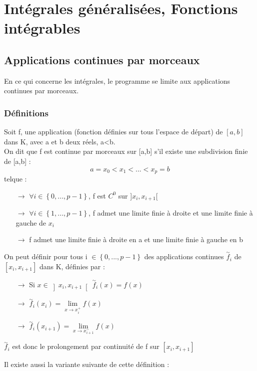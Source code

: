 \chapter{Intégrales généralisées, Fonctions intégrables}
\section{Applications continues par morceaux}
En ce qui concerne les intégrales, le programme se limite aux applications continues par morceaux.
\subsection{Définitions}
\begin{de}
Soit f, une application (fonction définies sur tous l'espace de départ) de $\left[a,b\right]$ dans K, avec a et b deux réels, a<b.\\
On dit que f est continue par morceaux sur [a,b] s'il existe une subdivision finie de [a,b] : 
$$a = x_0 < x_1 < ... < x_p = b$$
telque : 
\begin{itemize}
 \item[$\rightarrow$]$\forall i \in \left\lbrace0,...,p-1\right\rbrace$, f est $C^0$ sur ]$x_i,x_{i+1}$[ 
 \item[$\rightarrow$]$\forall i \in \left\lbrace1,...,p-1\right\rbrace$, f admet une limite finie à droite et une limite finie à gauche de $x_i$
 \item[$\rightarrow$]f admet une limite finie à droite en a et une limite finie à gauche en b
\end{itemize}
\end{de}
\begin{de}
On peut définir pour tous i $\in \left\lbrace0,...,p-1\right\rbrace$ des applications continues $\overset{\sim}f_i$ de  $\left[x_i,x_{i+1}\right]$ dans K, définies par : 
\begin{itemize}
 \item[$\rightarrow$]Si $x \in \left] x_i, x_{i+1}\right[~ \overset{\sim}f_i(x) = f(x) $
 \item[$\rightarrow$]$\overset{\sim}f_i(x_i) = \underset{x\rightarrow x_i^+}\lim f(x)$
 \item[$\rightarrow$]$\overset{\sim}f_i(x_{i+1}) = \underset{x\rightarrow x_{i+1}^-}\lim f(x)$
\end{itemize}
$\overset{\sim}f_i$ est donc le prolongement par continuité de f sur $\left[x_i,x_{i+1}\right]$  
\end{de}
Il existe aussi la variante suivante de cette définition : 
